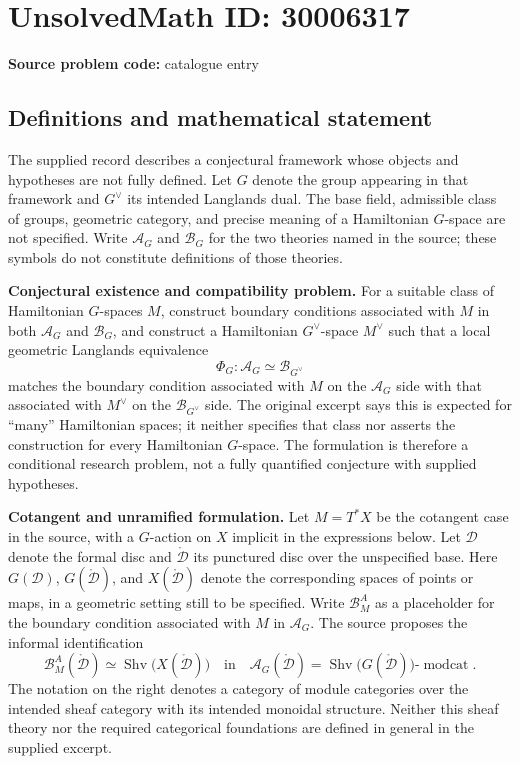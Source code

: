 \documentclass[11pt]{article}
\begin{document}
\section*{UnsolvedMath ID: 30006317}
\textbf{Source problem code:} catalogue entry
\subsection{Definitions and mathematical statement}
The supplied record describes a conjectural framework whose objects and hypotheses are not fully defined. Let \(G\) denote the group appearing in that framework and \(G^\vee\) its intended Langlands dual. The base field, admissible class of groups, geometric category, and precise meaning of a Hamiltonian \(G\)-space are not specified. Write \(\mathcal A_G\) and \(\mathcal B_G\) for the two theories named in the source; these symbols do not constitute definitions of those theories.

\textbf{Conjectural existence and compatibility problem.} For a suitable class of Hamiltonian \(G\)-spaces \(M\), construct boundary conditions associated with \(M\) in both \(\mathcal A_G\) and \(\mathcal B_G\), and construct a Hamiltonian \(G^\vee\)-space \(M^\vee\) such that a local geometric Langlands equivalence
\[
\Phi_G:\mathcal A_G\simeq\mathcal B_{G^\vee}
\]
matches the boundary condition associated with \(M\) on the \(\mathcal A_G\) side with that associated with \(M^\vee\) on the \(\mathcal B_{G^\vee}\) side. The original excerpt says this is expected for ``many'' Hamiltonian spaces; it neither specifies that class nor asserts the construction for every Hamiltonian \(G\)-space. The formulation is therefore a conditional research problem, not a fully quantified conjecture with supplied hypotheses.

\textbf{Cotangent and unramified formulation.} Let \(M=T^*X\) be the cotangent case in the source, with a \(G\)-action on \(X\) implicit in the expressions below. Let \(\mathcal D\) denote the formal disc and \(\mathring{\mathcal D}\) its punctured disc over the unspecified base. Here \(G(\mathcal D)\), \(G(\mathring{\mathcal D})\), and \(X(\mathring{\mathcal D})\) denote the corresponding spaces of points or maps, in a geometric setting still to be specified. Write \(\mathcal B^A_M\) as a placeholder for the boundary condition associated with \(M\) in \(\mathcal A_G\). The source proposes the informal identification
\[
\mathcal B^A_M(\mathring{\mathcal D})
\simeq \operatorname{Shv}\bigl(X(\mathring{\mathcal D})\bigr)
\quad\text{in}\quad
\mathcal A_G(\mathring{\mathcal D})
=\operatorname{Shv}\bigl(G(\mathring{\mathcal D})\bigr)\text{-}\operatorname{modcat}.
\]
The notation on the right denotes a category of module categories over the intended sheaf category with its intended monoidal structure. Neither this sheaf theory nor the required categorical foundations are defined in general in the supplied excerpt.
\end{document}
